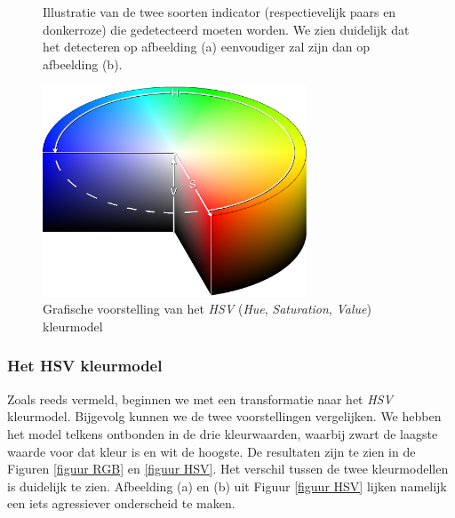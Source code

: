 \documentclass[a4paper,kulak]{kulakarticle}
\begin{document}
\begin{figure}[H]
	\centering
	\qquad
	
	\caption{Illustratie van de twee soorten indicator (respectievelijk paars en donkerroze) die gedetecteerd moeten worden. We zien duidelijk dat het detecteren op afbeelding (a) eenvoudiger zal zijn dan op afbeelding (b).}
	\label{figuur indicators}
\end{figure}

\begin{figure}[H]
	\centering
	\includegraphics[width=0.7\textwidth]{HSV_vb.png}
	
	\caption{Grafische voorstelling van het \textit{HSV} (\textit{Hue}, \textit{Saturation}, \textit{Value}) kleurmodel}
	\label{figuur hsv_schema}
\end{figure}

\subsubsection{Het HSV kleurmodel}
Zoals reeds vermeld, beginnen we met een transformatie naar het \textit{HSV} kleurmodel. Bijgevolg kunnen we de twee voorstellingen vergelijken. We hebben het model telkens ontbonden in de drie kleurwaarden, waarbij zwart de laagste waarde voor dat kleur is en wit de hoogste. De resultaten zijn te zien in de Figuren \ref{figuur RGB} en \ref{figuur HSV}. Het verschil tussen de twee kleurmodellen is duidelijk te zien. Afbeelding (a) en (b) uit Figuur \ref{figuur HSV} lijken namelijk een iets agressiever onderscheid te maken.
\end{document}
